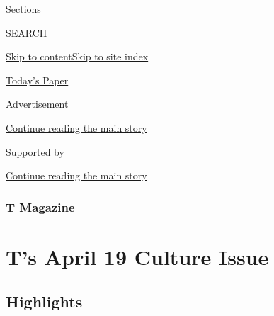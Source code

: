 Sections

SEARCH

\protect\hyperlink{site-content}{Skip to
content}\protect\hyperlink{site-index}{Skip to site index}

\href{https://myaccount.nytimes.com/auth/login?response_type=cookie\&client_id=vi}{}

\href{https://www.nytimes.com/section/todayspaper}{Today's Paper}

Advertisement

\protect\hyperlink{after-top}{Continue reading the main story}

Supported by

\protect\hyperlink{after-sponsor}{Continue reading the main story}

\hypertarget{t-magazine}{%
\subsubsection{\texorpdfstring{\href{/section/t-magazine}{T
Magazine}}{T Magazine}}\label{t-magazine}}

\hypertarget{ts-april-19-culture-issue}{%
\section{T's April 19 Culture Issue}\label{ts-april-19-culture-issue}}

\hypertarget{highlights}{%
\subsection{Highlights}\label{highlights}}

